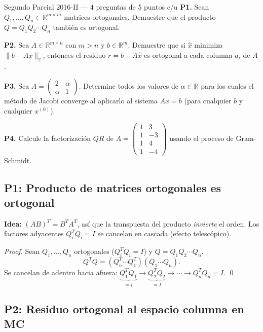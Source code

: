 \documentclass[11pt,a4paper]{article}
\begin{document}
\begin{examen}{Segundo Parcial 2016-II --- 4 preguntas de 5 puntos c/u}
\textbf{P1.} Sean $Q_1,\ldots,Q_n\in\mathbb{R}^{m\times m}$ matrices ortogonales. Demuestre que el producto $Q=Q_1Q_2\cdots Q_n$ también es ortogonal.

\smallskip\textbf{P2.} Sea $A\in\mathbb{R}^{m\times n}$ con $m>n$ y $b\in\mathbb{R}^m$. Demuestre que si $\hat x$ minimiza $\|b-Ax\|_2$, entonces el residuo $r=b-A\hat x$ es ortogonal a cada columna $a_i$ de $A$.

\smallskip\textbf{P3.} Sea $A=\begin{pmatrix}2&\alpha\\\alpha&1\end{pmatrix}$. Determine todos los valores de $\alpha\in\mathbb{R}$ para los cuales el método de Jacobi converge al aplicarlo al sistema $Ax=b$ (para cualquier $b$ y cualquier $x^{(0)}$).

\smallskip\textbf{P4.} Calcule la factorización $QR$ de $A=\begin{pmatrix}1&3\\1&-3\\1&4\\1&-4\end{pmatrix}$ usando el proceso de Gram-Schmidt.
\end{examen}

\subsection{P1: Producto de matrices ortogonales es ortogonal}
\label{sec:pt2_2016_p1}

\textbf{Idea:} $(AB)^T = B^TA^T$, así que la transpuesta del producto \emph{invierte} el orden. Los factores adyacentes $Q_i^TQ_i = I$ se cancelan en cascada (efecto telescópico).

\begin{proof}
Sean $Q_1, \ldots, Q_n$ ortogonales ($Q_i^T Q_i = I$) y $Q = Q_1 Q_2 \cdots Q_n$.
\[
  Q^T Q = (Q_n^T \cdots Q_1^T)(Q_1 \cdots Q_n).
\]
Se cancelan de adentro hacia afuera:
$\underbrace{Q_1^T Q_1}_{=I} \to \underbrace{Q_2^T Q_2}_{=I} \to \cdots \to Q_n^T Q_n = I$. \qed
\end{proof}

\subsection{P2: Residuo ortogonal al espacio columna en MC}
\label{sec:pt2_2016_p2}
\end{document}
